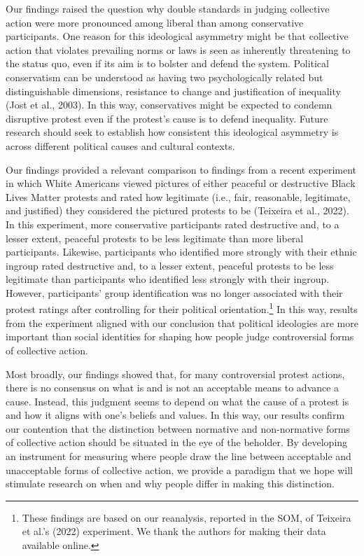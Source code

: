 \documentclass[twocolumn, 11pt, letterpaper]{article}
\begin{document}
Our findings raised the question why double standards in judging
collective action were more pronounced among liberal than among
conservative participants. One reason for this ideological asymmetry
might be that collective action that violates prevailing norms or laws
is seen as inherently threatening to the status quo, even if its aim is
to bolster and defend the system. Political conservatism can be
understood as having two psychologically related but distinguishable
dimensions, resistance to change and justification of inequality (Jost
et al., 2003). In this way, conservatives might be expected to condemn
disruptive protest even if the protest's cause is to defend inequality.
Future research should seek to establish how consistent this ideological
asymmetry is across different political causes and cultural contexts.

Our findings provided a relevant comparison to findings from a recent
experiment in which White Americans viewed pictures of either peaceful
or destructive Black Lives Matter protests and rated how legitimate
(i.e., fair, reasonable, legitimate, and justified) they considered the
pictured protests to be (Teixeira et al., 2022). In this experiment,
more conservative participants rated destructive and, to a lesser
extent, peaceful protests to be less legitimate than more liberal
participants. Likewise, participants who identified more strongly with
their ethnic ingroup rated destructive and, to a lesser extent, peaceful
protests to be less legitimate than participants who identified less
strongly with their ingroup. However, participants' group identification
was no longer associated with their protest ratings after controlling
for their political orientation.\footnote{These findings are based on
  our reanalysis, reported in the SOM, of Teixeira et al.'s (2022)
  experiment. We thank the authors for making their data available
  online.} In this way, results from the experiment aligned with our
conclusion that political ideologies are more important than social
identities for shaping how people judge controversial forms of
collective action.

Most broadly, our findings showed that, for many controversial protest
actions, there is no consensus on what is and is not an acceptable means
to advance a cause. Instead, this judgment seems to depend on what the
cause of a protest is and how it aligns with one's beliefs and values.
In this way, our results confirm our contention that the distinction
between normative and non-normative forms of collective action should be
situated in the eye of the beholder. By developing an instrument for
measuring where people draw the line between acceptable and unacceptable
forms of collective action, we provide a paradigm that we hope will
stimulate research on when and why people differ in making this
distinction.
\end{document}
